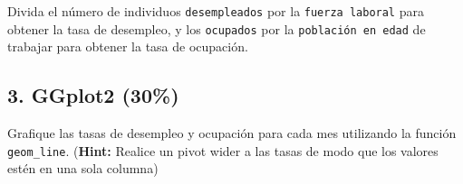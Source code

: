 \documentclass[
]{article}
\begin{document}
Divida el número de individuos \texttt{desempleados} por la
\texttt{fuerza\ laboral} para obtener la tasa de desempleo, y los
\texttt{ocupados} por la \texttt{población\ en\ edad} de trabajar para
obtener la tasa de ocupación.

\subsection{\texorpdfstring{\textbf{3. GGplot2
(30\%)}}{3. GGplot2 (30\%)}}\label{ggplot2-30}

Grafique las tasas de desempleo y ocupación para cada mes utilizando la
función \texttt{geom\_line}. (\textbf{Hint:} Realice un pivot wider a
las tasas de modo que los valores estén en una sola columna)
\end{document}
